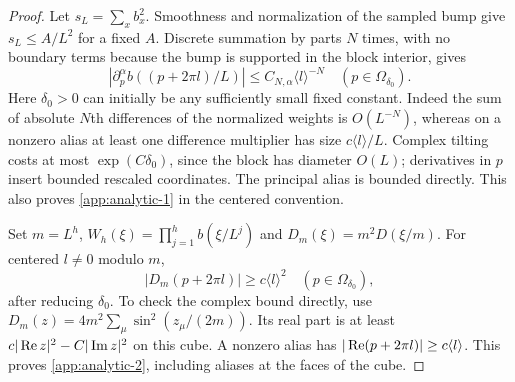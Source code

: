 \begin{proof}
Let $s_L=\sum_xb_x^2$.  Smoothness and normalization of the sampled
bump give $s_L\le A/L^2$ for a fixed $A$.  Discrete summation by parts
$N$ times, with no boundary terms because the bump is supported in the
block interior, gives
\begin{equation}
 |\partial_p^\alpha b((p+2\pi l)/L)|
       \le C_{N,\alpha}\langle l\rangle^{-N}
       \quad(p\in\Omega_{\delta_0}).                 \label{app:analytic-1}
\end{equation}
Here $\delta_0>0$ can initially be any sufficiently small fixed
constant.  Indeed the sum of absolute $N$th differences of the
normalized weights is $O(L^{-N})$, whereas on a nonzero alias at
least one difference multiplier has size $c\langle l\rangle/L$.
Complex tilting costs at most $\exp(C\delta_0)$, since the block has
diameter $O(L)$; derivatives in $p$ insert bounded rescaled coordinates.
The principal alias is bounded directly.  This also proves \eqref{app:analytic-1} in
the centered convention.

Set $m=L^h$, $W_h(\xi)=\prod_{j=1}^h b(\xi/L^j)$ and
$D_m(\xi)=m^2D(\xi/m)$.  For centered $l\ne0$ modulo $m$,
\begin{equation}
 |D_m(p+2\pi l)|\ge c\langle l\rangle^2
                    \quad(p\in\Omega_{\delta_0}),       \label{app:analytic-2}
\end{equation}
after reducing $\delta_0$.  To check the complex bound directly,
use $D_m(z)=4m^2\sum_\mu\sin^2(z_\mu/(2m))$.
Its real part is at least $c|\mathop{\rm Re}z|^2-C|\mathop{\rm Im}z|^2$
on this cube.  A nonzero alias has
$|\mathop{\rm Re}(p+2\pi l)|\ge c\langle l\rangle$.
This proves \eqref{app:analytic-2}, including aliases at the faces of the cube.


\end{proof}
